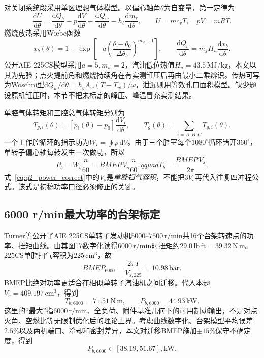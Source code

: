 对关闭系统段采用单区理想气体模型。以偏心轴角$\theta$为自变量，第一定律为
\begin{equation}
\frac{\mathrm dU}{\mathrm d\theta}
=\frac{\mathrm dQ_b}{\mathrm d\theta}
-p\frac{\mathrm dV}{\mathrm d\theta}
-\frac{\mathrm dQ_w}{\mathrm d\theta}
-h_\ell\frac{\mathrm dm_\ell}{\mathrm d\theta},
\qquad U=mc_vT,\quad pV=mRT .
\label{eq:q2_first_law}
\end{equation}
燃烧放热采用Wiebe函数
\begin{equation}
x_b(\theta)=1-\exp\left[-a\left(
\frac{\theta-\theta_0}{\Delta\theta_b}\right)^{m_w+1}\right],
\qquad \frac{\mathrm dQ_b}{\mathrm d\theta}
=m_fH_u\frac{\mathrm dx_b}{\mathrm d\theta}.
\label{eq:q2_wiebe}
\end{equation}
公开AIE 225CS模型采用$a=5,m_w=2$，汽油低位热值$H_u=43.5\,\mathrm{MJ/kg}$，本文以其为先验；点火提前角和燃烧持续角在有实测缸压后再由最小二乘辨识。传热可写为Woschni型$\mathrm dQ_w/\mathrm d\theta=h_gA_w(T-T_w)/\omega$，泄漏则用等效孔口面积模型。缺少题设原机缸压时，本节不把未标定的峰压、峰温冒充实测结果。

单腔气体转矩和三腔总气体转矩分别为
\begin{equation}
T_{g,i}(\theta)=[p_i(\theta)-p_0]
\frac{\mathrm dV_i}{\mathrm d\theta},\qquad
T_g(\theta)=\sum_{i=A,B,C}T_{g,i}(\theta).
\label{eq:q2_torque}
\end{equation}
一个工作腔循环的指示功为$W_i=\oint p\,\mathrm dV$。由于三个腔室每个$1080^\circ$循环错开$360^\circ$，单转子偏心轴每转发生一次做功，所以
\begin{equation}
P_b=W_b\frac{n}{60}=BMEP\,V_s\frac{n}{60},qquad
T_b=\frac{BMEP\,V_s}{2\pi}.
\label{eq:q2_power_correct}
\end{equation}
式~\eqref{eq:q2_power_correct}中的$V_s$是\emph{单腔扫气容积}，不能把$3V_s$再代入往复四冲程公式。该式是初稿功率口径必须修正的关键。

\subsection{6000 r/min最大功率的台架标定}

Turner等公开了AIE 225CS单转子发动机$5000$--$7500\,\mathrm{r/min}$共16个台架转速点的功率、扭矩曲线\cite{turner2018wankel}。由其图17数字化读得$6000\,\mathrm{r/min}$时扭矩约$29.0\,\mathrm{lb\,ft}=39.32\,\mathrm{N\,m}$。225CS单腔扫气容积为$225\,\mathrm{cm^3}$，故
\begin{equation}
BMEP_{6000}=\frac{2\pi T}{V_{s,225}}
=10.98\,\mathrm{bar}.
\label{eq:q2_bmep_cal}
\end{equation}
BMEP比绝对功率更适合在相似单转子汽油机之间迁移。代入本题$V_s=409.197\,\mathrm{cm^3}$，得到
\begin{equation}
T_{b,6000}=71.51\,\mathrm{N\,m},\qquad
P_{b,6000}=44.93\,\mathrm{kW}.
\label{eq:q2_power_result}
\end{equation}
这里的``最大''指$6000\,\mathrm{r/min}$、全负荷、附件基准几何下的可用制动输出，不是对点火角、空燃比等无限制优化后的理论上界。考虑曲线数字化、台架模型平均误差$2.5\%$以及两机端口、冷却和密封差异，本文对迁移BMEP施加$\pm15\%$保守不确定度，得到
\begin{equation}
P_{b,6000}\in[38.19,51.67],\mathrm{kW}.
\label{eq:q2_power_interval}
\end{equation}

